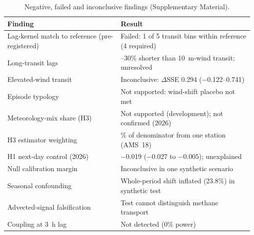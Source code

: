 \begin{table}[!t]
\centering
\caption{Negative, failed and inconclusive findings (Supplementary Material).}
\label{tab:negative}
\small
\begin{tabularx}{\textwidth}{@{}>{\raggedright\arraybackslash}p{}>{\raggedright\arraybackslash}X@{}}
\toprule
Finding & Result \\
\midrule
Lag-kernel match to reference (pre-registered) & Failed: 1 of 5 transit bins within reference (4 required) \\
Long-transit lags & 25--30\% shorter than 10~m-wind transit; unresolved \\
Elevated-wind transit & Inconclusive: $\Delta$SSE 0.294 ($-$0.122--0.741) \\
Episode typology & Not supported: wind-shift placebo not met \\
Meteorology-mix share (H3) & Not supported (development); not confirmed (2026) \\
H3 estimator weighting & 92.9\% of denominator from one station (AMS~18) \\
H1 next-day control (2026) & $-$0.019 ($-$0.027 to $-$0.005); unexplained \\
Null calibration margin & Inconclusive in one synthetic scenario \\
Seasonal confounding & Whole-period shift inflated (23.8\%) in synthetic test \\
Advected-signal falsification & Test cannot distinguish methane transport \\
Coupling at 3~h lag & Not detected (0\% power) \\
\bottomrule
\end{tabularx}
\end{table}
